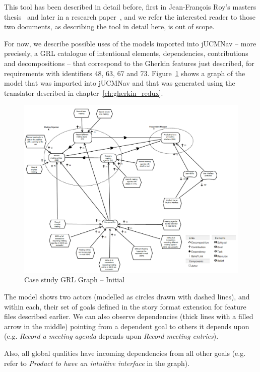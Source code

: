 \documentclass[dissertation,final]{softeng}
\begin{document}
This tool has been described in detail before, first in Jean-François Roy's masters thesis~\citep{Roy:2007wyba} and later in a research paper~\citep{Amyot2010}, and we refer the interested reader to those two documents, as describing the tool in detail here, is out of scope.

For now, we describe possible uses of the models imported into jUCMNav -- more precisely, a GRL catalogue of intentional elements, dependencies, contributions and decompositions -- that correspond to the Gherkin features just described, for requirements with identifiers 48, 63, 67 and 73. Figure~\ref{fig:InitialGRLGraph} shows a graph of the model that was imported into jUCMNav and that was generated using the translator described in chapter~\ref{ch:gherkin_redux}.

\begin{figure}
\includegraphics[width=\columnwidth]{casestudy-initial}
\centering
\caption{Case study GRL Graph -- Initial}
\label{fig:InitialGRLGraph}
\end{figure}

The model shows two actors (modelled as circles drawn with dashed lines), and within each, their set of goals defined in the story format extension for feature files described earlier. We can also observe dependencies (thick lines with a filled arrow in the middle) pointing from a dependent goal to others it depends upon (e.g. \emph{Record a meeting agenda} depends upon \emph{Record meeting entries}). 

Also, all global qualities have incoming dependencies from all other goals (e.g. refer to \emph{Product to have an intuitive interface} in the graph).
\end{document}
